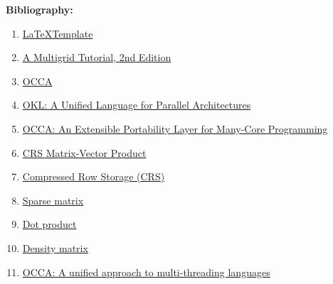 \documentclass[a4paper, 8pt, oneside]{Thesis}  %
\begin{document}
%

\textbf{Bibliography: }
\begin{enumerate}
  \item \href{https://www.overleaf.com/latex/templates/template-for-a-masters-slash-doctoral-thesis/mkzrzktcbzfl#.WxVLAFOFPOQ}{\LaTeX \quad Template}
  \item \label{txt:multigrid} \href{https://www.researchgate.net/publication/220690328\_A\_Multigrid\_Tutorial\_2nd\_Edition}{A Multigrid Tutorial, 2nd Edition}
  \item \label{txt:mainOCCA} \href{https://libocca.org/}{OCCA}
  \item \label{txt:occa} \href{https://scholarship.rice.edu/bitstream/handle/1911/102233/TR15-04.pdf?sequence=1&isAllowed=y}{OKL: A Unified Language for Parallel Architectures}
  \item \href{http://www.speedup.ch/workshops/w43\_2014/pdf/TimWarburton.pdf}{OCCA: An Extensible Portability Layer for Many-Core Programming}
  \item \label{txt:CSR} \href{http://www.netlib.org/linalg/html\_templates/node98.html}{CRS Matrix-Vector Product}
  \item \href{http://netlib.org/linalg/html\_templates/node91.html}{Compressed Row Storage (CRS)}
  \item \label{txt:sparsematrixformat} \href{https://en.wikipedia.org/wiki/Sparse\_matrix}{Sparse matrix}
  \item \href{https://en.wikipedia.org/wiki/Dot_product}{Dot product}
  \item \href{https://en.wikipedia.org/wiki/Density\_matrix}{Density matrix}
  \item \href{https://arxiv.org/pdf/1403.0968.pdf}{OCCA: A unified approach to multi-threading languages}
	  
	

\end{enumerate}
\end{document}

